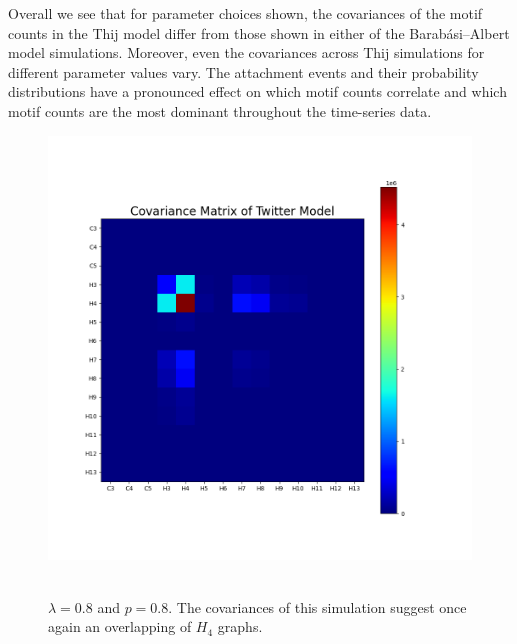 Overall we see that for parameter choices shown, the covariances of the motif counts in the Thij model
differ from those shown in either of the Barabási–Albert model simulations. Moreover, even the covariances
across Thij simulations for different parameter values vary. The attachment events and their probability
distributions have a pronounced effect on which motif counts correlate and which motif counts are the 
most dominant throughout the time-series data. 
 \FloatBarrier


\begin{figure}
    \includegraphics[width=0.9\linewidth]{Images/CovMatTwitterModel080809.png}\
    \centering
    \caption{$\lambda=0.8$ and $p=0.8$. The covariances of this simulation suggest once again
    an overlapping of $H_{4}$ graphs. }
    \label{fig:covmat0808}
\end{figure}

